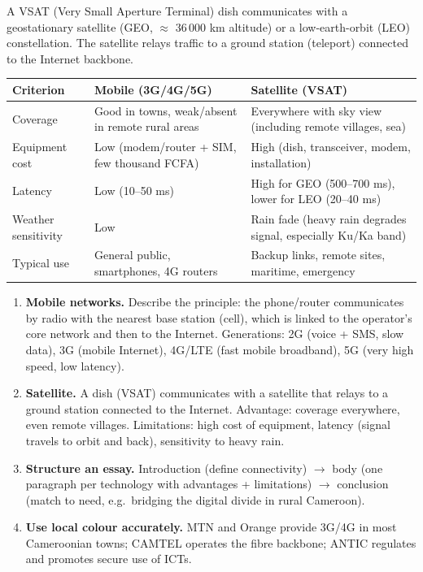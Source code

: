 \documentclass[11pt]{article}
\newcommand{\cle}[1]{{\popxbold\color{popdark}#1}}
\begin{document}
\begin{definition}
A \cle{VSAT} (Very Small Aperture Terminal) dish communicates with a geostationary satellite (GEO, $\approx$ 36\,000 km altitude) or a low-earth-orbit (LEO) constellation. The satellite relays traffic to a ground station (teleport) connected to the Internet backbone.
\end{definition}

\begin{aretenir}
\begin{center}
\begin{tabularx}{\linewidth}{|l|X|X|}
\hline
\rowcolor{popblueL} \textbf{Criterion} & \textbf{Mobile (3G/4G/5G)} & \textbf{Satellite (VSAT)} \\
\hline
Coverage & Good in towns, weak/absent in remote rural areas & Everywhere with sky view (including remote villages, sea) \\
\hline
Equipment cost & Low (modem/router + SIM, few thousand FCFA) & High (dish, transceiver, modem, installation) \\
\hline
Latency & Low (10--50 ms) & High for GEO (500--700 ms), lower for LEO (20--40 ms) \\
\hline
Weather sensitivity & Low & Rain fade (heavy rain degrades signal, especially Ku/Ka band) \\
\hline
Typical use & General public, smartphones, 4G routers & Backup links, remote sites, maritime, emergency \\
\hline
\end{tabularx}
\end{center}
\end{aretenir}

\begin{methode}
\begin{enumerate}
\item \textbf{Mobile networks.} Describe the principle: the phone/router communicates by radio with the nearest base station (cell), which is linked to the operator's core network and then to the Internet. Generations: 2G (voice + SMS, slow data), 3G (mobile Internet), 4G/LTE (fast mobile broadband), 5G (very high speed, low latency).
\item \textbf{Satellite.} A dish (VSAT) communicates with a satellite that relays to a ground station connected to the Internet. Advantage: coverage everywhere, even remote villages. Limitations: high cost of equipment, latency (signal travels to orbit and back), sensitivity to heavy rain.
\item \textbf{Structure an essay.} Introduction (define connectivity) $\rightarrow$ body (one paragraph per technology with advantages + limitations) $\rightarrow$ conclusion (match to need, e.g.\ bridging the digital divide in rural Cameroon).
\item \textbf{Use local colour accurately.} MTN and Orange provide 3G/4G in most Cameroonian towns; CAMTEL operates the fibre backbone; ANTIC regulates and promotes secure use of ICTs.
\end{enumerate}
\end{methode}
\end{document}
